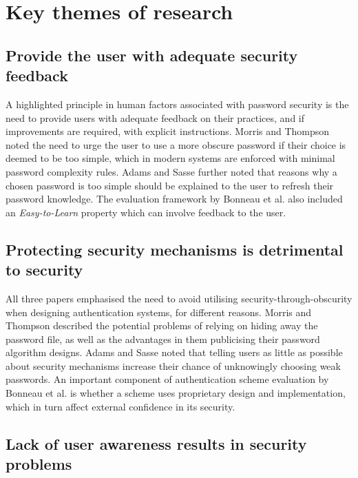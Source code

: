 \documentclass[11pt]{article}
\begin{document}
\section{Key themes of research}

\subsection{Provide the user with adequate security feedback}

A highlighted principle in human factors associated with password security is the need to provide users with adequate feedback on their practices, and if improvements are required, with explicit instructions. Morris and Thompson \cite[p. 596]{morris1979password} noted the need to urge the user to use a more obscure password if their choice is deemed to be too simple, which in modern systems are enforced with minimal password complexity rules. Adams and Sasse \cite[p. 6]{adams1999users} further noted that reasons why a chosen password is too simple should be explained to the user to refresh their password knowledge. The evaluation framework by Bonneau et al. \cite[Sec. II]{bonneau2012quest} also included an \emph{Easy-to-Learn} property which can involve feedback to the user.

\subsection{Protecting security mechanisms is detrimental to security}

All three papers emphasised the need to avoid utilising security-through-obscurity when designing authentication systems, for different reasons. Morris and Thompson \cite[p. 594, p.597]{morris1979password} described the potential problems of relying on hiding away the password file, as well as the advantages in them 
publicising their password algorithm designs. Adams and Sasse \cite[p. 4]{adams1999users} noted that telling users as little as possible about security mechanisms increase their chance of unknowingly choosing weak passwords. An important component of authentication scheme evaluation by Bonneau et al. \cite[Sec. IV]{bonneau2012quest} is whether a scheme uses proprietary design and implementation, which in turn affect external confidence in its security.

\subsection{Lack of user awareness results in security problems}
\end{document}
